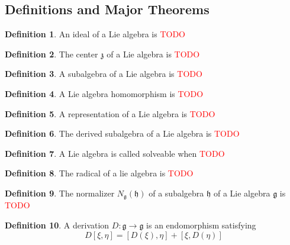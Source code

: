 \documentclass[10.5pt]{article}
\theoremstyle{definition}
\newtheorem{definition}{Definition}
\numberwithin{example}{subsection}
\numberwithin{proposition}{subsection}
\numberwithin{pb}{subsection}
\begin{document}
    
    \subsection{Definitions and Major Theorems}

    \begin{definition}
        An ideal of a Lie algebra is \textcolor{red}{TODO}
    \end{definition}

    \begin{definition}
        The center \(\mathfrak{z}\) of a Lie algebra is \textcolor{red}{TODO}
    \end{definition}

    \begin{definition}
        A subalgebra of a Lie algebra is \textcolor{red}{TODO}
    \end{definition}

    \begin{definition}
        A Lie algebra homomorphism is \textcolor{red}{TODO}
    \end{definition}

    \begin{definition}
        A representation of a Lie algebra is \textcolor{red}{TODO}
    \end{definition}

    \begin{definition}
        The derived subalgebra of a Lie algebra is \textcolor{red}{TODO}
    \end{definition}

    \begin{definition}
        A Lie algebra is called solveable when \textcolor{red}{TODO}
    \end{definition}

    \begin{definition}
        The radical of a lie algebra is \textcolor{red}{TODO}
    \end{definition}

    \begin{definition}
        The normalizer \(N_\mathfrak{g}(\mathfrak{h})\) of a subalgebra \(\mathfrak{h}\) of a Lie algebra \(\mathfrak{g}\) is \textcolor{red}{TODO}
    \end{definition}

    \begin{definition}\label{Derivation}
        A derivation \(D: \mathfrak{g} \to \mathfrak{g}\) is an endomorphism satisfying 
        \begin{equation}
            D[\xi,\eta] = [D(\xi),\eta] + [\xi,D(\eta)]
        \end{equation}
    \end{definition}
\end{document}
